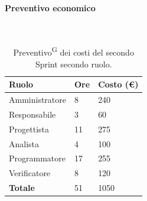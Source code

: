 \documentclass[8pt]{article}
\newcommand{\glossterm}[1]{#1\textsuperscript{G}} %
\newcommand{\subsubsubsection}[1]{\paragraph{#1}\mbox{}\\}
\begin{document}
\subsubsubsection{Preventivo economico}
\begin{table}[ht!]
	\centering
	\begin{tabular}{p{4cm} p{1cm} p{2cm}}
        \toprule
        \textbf{Ruolo} & \textbf{Ore} & \textbf{Costo (€)} \\
        \midrule
        Amministratore & 8 & 240 \\
        Responsabile & 3 & 60 \\
        Progettista & 11 & 275 \\
        Analista & 4 & 100 \\
        Programmatore & 17 & 255 \\
        Verificatore & 8 & 120 \\
        \midrule
        \textbf{Totale} & 51 & 1050 \\
        \bottomrule
    \end{tabular}
    \caption{\glossterm{Preventivo} dei costi del secondo Sprint secondo ruolo.}
	\label{table:Preventivo dei costi del secondo Sprint secondo ruolo}
\end{table}
\end{document}
